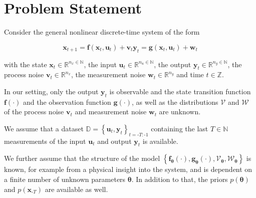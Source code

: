 \section{Problem Statement} \label{Problem Statement}

Consider the general nonlinear discrete-time system of the form

\begin{subequations} \label{System equation}
\begin{equation}
\boldsymbol{x}_{t+1} = \boldsymbol{f} \left( \boldsymbol{x}_{t}, \boldsymbol{u}_t \right) + \boldsymbol{v}_{t}
\end{equation}
\begin{equation}
\boldsymbol{y}_{t} = \boldsymbol{g} \left( \boldsymbol{x}_{t}, \boldsymbol{u}_t \right) + \boldsymbol{w}_{t}
\end{equation}
\end{subequations}

with the state $\boldsymbol{x}_t \in \mathbb{R}^{n_x \in \mathbb{N}}$, the input $\boldsymbol{u}_t \in \mathbb{R}^{n_u \in \mathbb{N}}$, the output $\boldsymbol{y}_t \in \mathbb{R}^{n_y \in \mathbb{N}}$, the process noise $\boldsymbol{v}_{t} \in \mathbb{R}^{n_x}$, the measurement noise $\boldsymbol{w}_{t} \in \mathbb{R}^{n_y}$ and time $t \in \mathbb{Z}$. 

In our setting, only the output $\boldsymbol{y}_t$ is observable and the state transition function $\boldsymbol{f}(\cdot)$ and the observation function $\boldsymbol{g}(\cdot)$, as well as the distributions $\boldsymbol{\mathcal{V}}$ and $\boldsymbol{\mathcal{W}}$ of the process noise $\boldsymbol{v}_t$ and measurement noise $\boldsymbol{w}_t$ are unknown.

We assume that a dataset $\mathbb{D} = \left\{\boldsymbol{u}_{t}, \boldsymbol{y}_{t}\right\}_{t = \text{-}T:\text{-}1}$ containing the last $T \in \mathbb{N}$ measurements of the input $\boldsymbol{u}_t$ and output $\boldsymbol{y}_t$ is available.

We further assume that the structure of the model $\left\{\boldsymbol{f}_{\boldsymbol{\theta}}(\cdot), \boldsymbol{g}_{\boldsymbol{\theta}}(\cdot), \boldsymbol{\mathcal{V}}_{\boldsymbol{\theta}}, \boldsymbol{\mathcal{W}}_{\boldsymbol{\theta}}\right\}$ is known, for example from a physical insight into the system, and is dependent on a finite number of unknown parameters $\boldsymbol{\theta}$. In addition to that, the priors $p(\boldsymbol{\theta})$ and $p(\boldsymbol{x}_{\text{-}T})$ are available as well.

